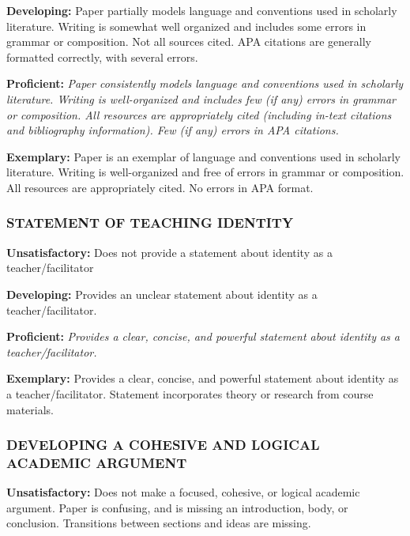 \documentclass[
]{book}
\begin{document}
\textbf{Developing:} Paper partially models language and conventions used in scholarly literature. Writing is somewhat well organized and includes some errors in grammar or composition. Not all sources cited. APA citations are generally formatted correctly, with several errors.

\textbf{Proficient:} \emph{Paper consistently models language and conventions used in scholarly literature. Writing is well-organized and includes few (if any) errors in grammar or composition. All resources are appropriately cited (including in-text citations and bibliography information). Few (if any) errors in APA citations.}

\textbf{Exemplary:} Paper is an exemplar of language and conventions used in scholarly literature. Writing is well-organized and free of errors in grammar or composition. All resources are appropriately cited. No errors in APA format.

\hypertarget{statement-of-teaching-identity}{%
\subsubsection*{STATEMENT OF TEACHING IDENTITY}\label{statement-of-teaching-identity}}

\textbf{Unsatisfactory:} Does not provide a statement about identity as a teacher/facilitator

\textbf{Developing:} Provides an unclear statement about identity as a teacher/facilitator.

\textbf{Proficient:} \emph{Provides a clear, concise, and powerful statement about identity as a teacher/facilitator.}

\textbf{Exemplary:} Provides a clear, concise, and powerful statement about identity as a teacher/facilitator. Statement incorporates theory or research from course materials.

\hypertarget{developing-a-cohesive-and-logical-academic-argument}{%
\subsubsection*{DEVELOPING A COHESIVE AND LOGICAL ACADEMIC ARGUMENT}\label{developing-a-cohesive-and-logical-academic-argument}}

\textbf{Unsatisfactory:} Does not make a focused, cohesive, or logical academic argument. Paper is confusing, and is missing an introduction, body, or conclusion. Transitions between sections and ideas are missing.
\end{document}
